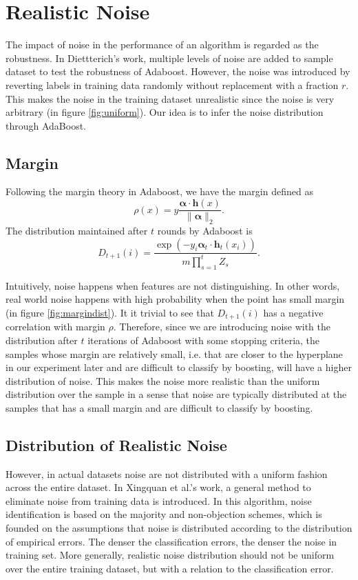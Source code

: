 \section{Realistic Noise}
The impact of noise in the performance of an algorithm is regarded as the robustness.
In Diettterich’s work\cite{dietterich2000experimental}, multiple levels of noise are added to sample dataset to test the robustness of Adaboost.
However, the noise was introduced by reverting labels in training data randomly without replacement with a fraction $r$.
This makes the noise in the training dataset unrealistic since the noise is very arbitrary (in figure \ref{fig:uniform}).
Our idea is to infer the noise distribution through AdaBoost.



\subsection{Margin}
Following the margin theory in Adaboost, we have the margin defined as
\[\rho(x) = y \frac{ \mathbf{\alpha} \cdot \mathbf{h}(x) }{ \| \mathbf{\alpha}\|_2 }.\]
The distribution maintained after $t$ rounds by Adaboost is
\[D_{t+1}(i) = \frac{\exp( -y_i \mathbf{\alpha}_t \cdot \mathbf{h}_t (x_i) ) }{m \prod_{s=1}^t Z_s}.\]

Intuitively, noise happens when features are not distinguishing. In other words, real world noise happens with high probability when the point has small margin (in figure \ref{fig:margindist}).
It it trivial to see that $D_{t+1}(i)$ has a negative correlation with margin $\rho$.
Therefore, since we are introducing noise with the distribution after $t$ iterations of Adaboost with some stopping criteria,
the samples whose margin are relatively small, i.e. that are closer to the hyperplane in our experiment later and
are difficult to classify by boosting, will have a higher distribution of noise.
This makes the noise more realistic than the uniform distribution over the sample in a sense that
noise are typically distributed at the samples that has a small margin and are difficult to classify by boosting.

\subsection{Distribution of Realistic Noise}
However, in actual datasets noise are not distributed with a uniform fashion across the entire dataset.
In Xingquan et al.’s work\cite{zhu2003eliminating}, a general method to eliminate noise from training data is introduced.
In this algorithm, noise identification is based on the majority and non-objection schemes,
which is founded on the assumptions that noise is distributed according to the distribution of empirical errors.
The denser the classification errors, the denser the noise in training set.
More generally, realistic noise distribution should not be uniform over the entire training dataset, but with a relation to the classification error.

